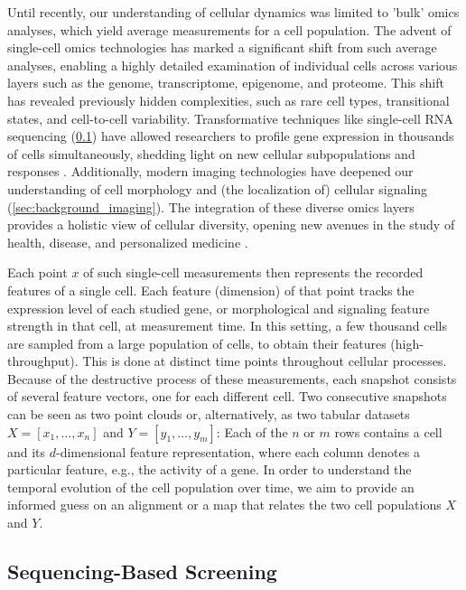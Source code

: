 Until recently, our understanding of cellular dynamics was limited to 'bulk' omics analyses, which yield average measurements for a cell population.
The advent of single-cell omics technologies has marked a significant shift from such average analyses, enabling a highly detailed examination of individual cells across various layers such as the genome, transcriptome, epigenome, and proteome.
This shift has revealed previously hidden complexities, such as rare cell types, transitional states, and cell-to-cell variability. Transformative techniques like single-cell RNA sequencing (\cref{sec:background_sequencing}) have allowed researchers to profile gene expression in thousands of cells simultaneously, shedding light on new cellular subpopulations and responses \citep{jia2022high}.
Additionally, modern imaging technologies have deepened our understanding of cell morphology and (the localization of) cellular signaling (\cref{sec:background_imaging}). 
The integration of these diverse omics layers provides a holistic view of cellular diversity, opening new avenues in the study of health, disease, and personalized medicine \citep{baysoy2023technological}.

Each point $x$ of such single-cell measurements then represents the recorded features of a single cell. Each feature (dimension) of that point tracks the expression level of each studied gene, or morphological and signaling feature strength in that cell, at measurement time. In this setting, a few thousand cells are sampled from a large population of cells, to obtain their features (high-throughput). This is done at distinct time points throughout cellular processes. Because of the destructive process of these measurements, each snapshot consists of several feature vectors, one for each different cell.
Two consecutive snapshots can be seen as two point clouds %
or, alternatively, as two tabular datasets $X = [x_1,\dots, x_n]$ and $Y=[y_1, \dots, y_m]$: Each of the $n$ or $m$ rows contains a cell and its $d$-dimensional feature representation, where each column denotes a particular feature, e.g., the activity of a gene.
In order to understand the temporal evolution of the cell population over time, we aim to provide an informed guess on an alignment or a map that relates the two cell populations $X$ and $Y$.

\subsection{Sequencing-Based Screening}
\label{sec:background_sequencing}

